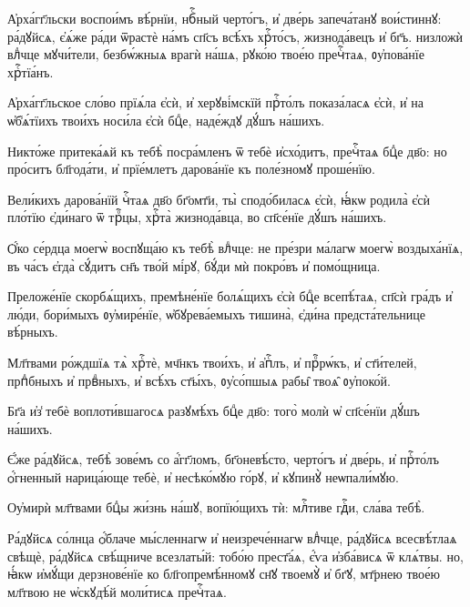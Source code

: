 \hKv А҆рха́гг҃льски воспои́мъ вѣ́рнїи, нбⷭ҇ный черто́гъ, и҆  две́рь запеча́танꙋ вои́стиннꙋ: ра́дꙋйсѧ, є҆ѧ́же ра́ди  ѿрастѐ на́мъ сп҃съ всѣ́хъ хрⷭ҇то́съ, жизнода́вецъ и҆  бг҃ъ. низложѝ влⷣчце мꙋчи́тели, безбѡ́жныѧ врагѝ на́шѧ,  рꙋко́ю твое́ю пречⷭ҇таѧ, ᲂу҆пова́нїе хрⷭ҇тїа́нъ.  
%

\hKv А҆рха́гг҃льское сло́во прїѧ́ла є҆сѝ, и҆ херꙋві́мскїй  прⷭ҇то́лъ показа́ласѧ є҆сѝ, и҆ на ѡ҆б̾ѧ́тїихъ твои́хъ  носи́ла є҆сѝ бцⷣе, наде́ждꙋ дꙋ́шъ на́шихъ.  
%

\hKv Никто́же притека́ѧй къ тебѣ̀ посра́мленъ ѿ тебѐ  и҆схо́дитъ, пречⷭ҇таѧ бцⷣе дв҃о: но про́ситъ бл҃года́ти, и҆  прїе́млетъ дарова́нїе къ поле́зномꙋ проше́нїю. 
%

\hKv Вели́кихъ дарова́нїй чⷭ҇таѧ дв҃о бг҃омт҃и, ты̀ сподо́биласѧ  є҆сѝ, ꙗ҆́кѡ родила̀ є҆сѝ пло́тїю є҆ди́наго ѿ трⷪ҇цы,  хрⷭ҇та̀ жизнода́вца, во сп҃се́нїе дꙋ́шъ на́шихъ. 
%

\hKv Ѻ҆́ко се́рдца моегѡ̀ воспꙋща́ю къ тебѣ̀ влⷣчце: не  пре́зри ма́лагѡ моегѡ̀ воздыха́нїѧ, въ ча́съ є҆гда̀ сꙋ́дитъ  сн҃ъ тво́й мі́рꙋ, бꙋ́ди мѝ покро́въ и҆ помо́щница.  
%

\hKv Преложе́нїе скорбѧ́щихъ, премѣне́нїе болѧ́щихъ є҆сѝ бцⷣе  всепѣ́таѧ, сп҃сѝ гра́дъ и҆ лю́ди, бори́мыхъ ᲂу҆мире́нїе,  ѡ҆бꙋрева́емыхъ тишина̀, є҆ди́на предста́тельнице вѣ́рныхъ.  
%

\hKv Мл҃твами ро́ждшїѧ тѧ̀ хрⷭ҇тѐ, мч҃нкъ твои́хъ, и҆ а҆пⷭ҇лъ,  и҆ прⷪ҇рѡ́къ, и҆ ст҃и́телей, прпⷣбныхъ и҆ првⷣныхъ, и҆  всѣ́хъ ст҃ы́хъ, ᲂу҆со́пшыѧ рабы̑ твоѧ̑ ᲂу҆поко́й. 
%

\hKv Бг҃а и҆з̾ тебѐ воплоти́вшагосѧ разꙋмѣ́хъ бцⷣе дв҃о:  того̀ молѝ ѡ҆ сп҃се́нїи дꙋ́шъ на́шихъ. 
%

\hKv Є҆́же ра́дꙋйсѧ, тебѣ̀ зове́мъ со а҆́гг҃ломъ,  бг҃оневѣ́сто, черто́гъ и҆ две́рь, и҆ прⷭ҇то́лъ ѻ҆́гненный  нарица́юще тебѐ, и҆ несѣко́мꙋю го́рꙋ, и҆ кꙋпинꙋ̀  неѡпали́мꙋю.  
%

\hKv Оу҆мирѝ мл҃твами бцⷣы жи́знь на́шꙋ, вопїю́щихъ тѝ:  млⷭ҇тиве гдⷭ҇и, сла́ва тебѣ̀. 
%

\hKv Ра́дꙋйсѧ со́лнца ѻ҆́блаче мы́сленнагѡ и҆ неизрече́ннагѡ  влⷣчце, ра́дꙋйсѧ всесвѣ́тлаѧ свѣщѐ, ра́дꙋйсѧ свѣ́щниче  всезлаты́й: тобо́ю прест҃а́ѧ, є҆́ѵа и҆зба́висѧ ѿ клѧ́твы.  но, ꙗ҆́кѡ и҆мꙋ́щи дерзнове́нїе ко бл҃гопремѣ́нномꙋ сн҃ꙋ  твоемꙋ̀ и҆ бг҃ꙋ, мт҃рнею твое́ю мл҃твою не ѡ҆скꙋдѣ́й  моли́тисѧ пречⷭ҇таѧ. 
%

